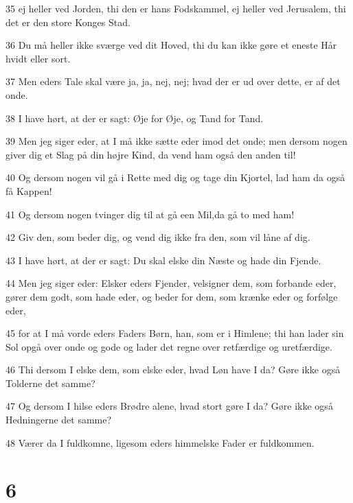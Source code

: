 \par 35 ej heller ved Jorden, thi den er hans Fodskammel, ej heller ved Jerusalem, thi det er den store Konges Stad.
\par 36 Du må heller ikke sværge ved dit Hoved, thi du kan ikke gøre et eneste Hår hvidt eller sort.
\par 37 Men eders Tale skal være ja, ja, nej, nej; hvad der er ud over dette, er af det onde.
\par 38 I have hørt, at der er sagt: Øje for Øje, og Tand for Tand.
\par 39 Men jeg siger eder, at I må ikke sætte eder imod det onde; men dersom nogen giver dig et Slag på din højre Kind, da vend ham også den anden til!
\par 40 Og dersom nogen vil gå i Rette med dig og tage din Kjortel, lad ham da også få Kappen!
\par 41 Og dersom nogen tvinger dig til at gå een Mil,da gå to med ham!
\par 42 Giv den, som beder dig, og vend dig ikke fra den, som vil låne af dig.
\par 43 I have hørt, at der er sagt: Du skal elske din Næste og hade din Fjende.
\par 44 Men jeg siger eder: Elsker eders Fjender, velsigner dem, som forbande eder, gører dem godt, som hade eder, og beder for dem, som krænke eder og forfølge eder,
\par 45 for at I må vorde eders Faders Børn, han, som er i Himlene; thi han lader sin Sol opgå over onde og gode og lader det regne over retfærdige og uretfærdige.
\par 46 Thi dersom I elske dem, som elske eder, hvad Løn have I da? Gøre ikke også Tolderne det samme?
\par 47 Og dersom I hilse eders Brødre alene, hvad stort gøre I da? Gøre ikke også Hedningerne det samme?
\par 48 Værer da I fuldkomne, ligesom eders himmelske Fader er fuldkommen.

\chapter{6}

